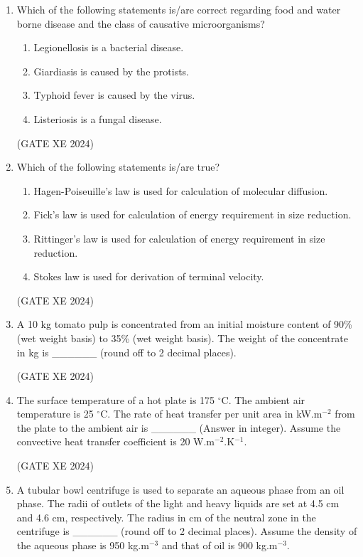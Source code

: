 \documentclass[12pt]{article}
\begin{document}
\begin{enumerate}
(GATE XE 2024)

\item Which of the following statements is/are correct regarding food and water borne disease and the class of causative microorganisms?  

\begin{enumerate}
\item Legionellosis is a bacterial disease.  
\item Giardiasis is caused by the protists.  
\item Typhoid fever is caused by the virus.  
\item Listeriosis is a fungal disease.  
\end{enumerate}

(GATE XE 2024)

\item Which of the following statements is/are true?  

\begin{enumerate}
\item Hagen-Poiseuille’s law is used for calculation of molecular diffusion.  
\item Fick’s law is used for calculation of energy requirement in size reduction.  
\item Rittinger’s law is used for calculation of energy requirement in size reduction.  
\item Stokes law is used for derivation of terminal velocity.  
\end{enumerate}

(GATE XE 2024)

\item A 10 kg tomato pulp is concentrated from an initial moisture content of 90\% (wet weight basis) to 35\% (wet weight basis). The weight of the concentrate in kg is \_\_\_\_\_\_ (round off to 2 decimal places).  

(GATE XE 2024)

\item The surface temperature of a hot plate is 175 $^\circ$C. The ambient air temperature is 25 $^\circ$C. The rate of heat transfer per unit area in kW.m$^{-2}$ from the plate to the ambient air is \_\_\_\_\_\_ (Answer in integer). Assume the convective heat transfer coefficient is 20 W.m$^{-2}$.K$^{-1}$.  

(GATE XE 2024)

\item A tubular bowl centrifuge is used to separate an aqueous phase from an oil phase. The radii of outlets of the light and heavy liquids are set at 4.5 cm and 4.6 cm, respectively. The radius in cm of the neutral zone in the centrifuge is \_\_\_\_\_\_ (round off to 2 decimal places). Assume the density of the aqueous phase is 950 kg.m$^{-3}$ and that of oil is 900 kg.m$^{-3}$.  


\end{enumerate}
\end{document}
